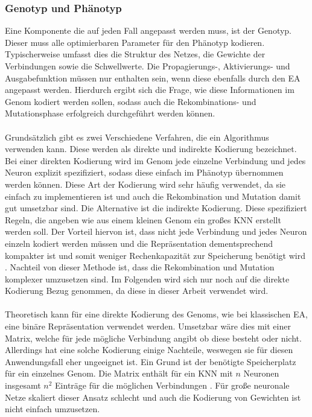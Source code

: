 \subsubsection{Genotyp und Phänotyp}
Eine Komponente die auf jeden Fall angepasst werden muss, ist der Genotyp. Dieser muss alle optimierbaren Parameter für den Phänotyp kodieren. Typischerweise umfasst dies die Struktur des Netzes, die Gewichte der Verbindungen sowie die Schwellwerte. Die Propagierungs-, Aktivierungs- und Ausgabefunktion müssen nur enthalten sein, wenn diese ebenfalls durch den \ac{EA} angepasst werden. Hierdurch ergibt sich die Frage, wie diese Informationen im Genom kodiert werden sollen, sodass auch die Rekombinations- und Mutationsphase erfolgreich durchgeführt werden können. 
\\\\
Grundsätzlich gibt es zwei Verschiedene Verfahren, die ein Algorithmus verwenden kann. Diese werden als direkte und indirekte Kodierung bezeichnet. Bei einer direkten Kodierung wird im Genom jede einzelne Verbindung und jedes Neuron explizit spezifiziert, sodass diese einfach im Phänotyp übernommen werden können. Diese Art der Kodierung wird sehr häufig verwendet, da sie einfach zu implementieren ist und auch die Rekombination und Mutation damit gut umsetzbar sind. Die Alternative ist die indirekte Kodierung. Diese spezifiziert Regeln, die angeben wie aus einem kleinen Genom ein großes \ac{KNN} erstellt werden soll. Der Vorteil hiervon ist, dass nicht jede Verbindung und jedes Neuron einzeln kodiert werden müssen und die Repräsentation dementsprechend kompakter ist und somit weniger Rechenkapazität zur Speicherung benötigt wird \cite{stanley2002evolving}. Nachteil von dieser Methode ist, dass die Rekombination und Mutation komplexer umzusetzen sind. Im Folgenden wird sich nur noch auf die direkte Kodierung Bezug genommen, da diese in dieser Arbeit verwendet wird.
\\\\
Theoretisch kann für eine direkte Kodierung des Genoms, wie bei klassischen \ac{EA}, eine binäre Repräsentation verwendet werden. Umsetzbar wäre dies mit einer Matrix, welche für jede mögliche Verbindung angibt ob diese besteht oder nicht. Allerdings hat eine solche Kodierung einige Nachteile, weswegen sie für diesen Anwendungsfall eher ungeeignet ist. Ein Grund ist der benötigte Speicherplatz für ein einzelnes Genom. Die Matrix enthält für ein \ac{KNN} mit $n$ Neuronen insgesamt $n^2$ Einträge für die möglichen Verbindungen \cite{stanley2002evolving}. Für große neuronale Netze skaliert dieser Ansatz schlecht und auch die Kodierung von Gewichten ist nicht einfach umzusetzen.
